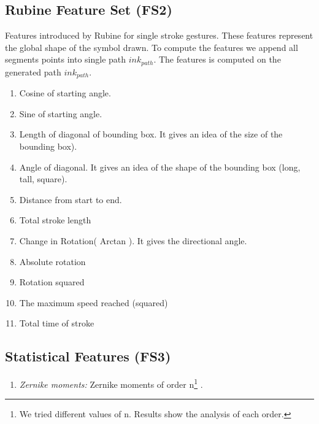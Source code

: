 %		
%		
%
\subsection{Rubine Feature Set (FS2)} Features introduced by Rubine\cite{gestureexample12} for single stroke gestures. These features represent the global shape of the symbol drawn. To compute the features we append all segments points into single path $ink_{path}$. The features is computed on the generated path $ink_{path}$.%
\begin{enumerate}
	\item Cosine of starting angle.
	\item Sine of starting angle.
	\item Length of diagonal of bounding box. It gives an idea of the size of the bounding box).
	\item Angle of diagonal. It gives an idea of the shape of the bounding box (long, tall, square).
	\item Distance from start to end.  
	\item Total stroke length
	\item Change in Rotation( Arctan ). It gives the directional angle.
	\item Absolute rotation 
	\item Rotation squared 
	\item The maximum speed reached (squared) 
	\item Total time of stroke 
\end{enumerate}
\subsection{Statistical Features (FS3)} 
\begin{enumerate}
	\item \textsl{Zernike moments:} Zernike moments of order n\footnote{ We tried different values of n. Results show the analysis of each order.} \cite{HeloiseBeautification}. 
\end{enumerate}
